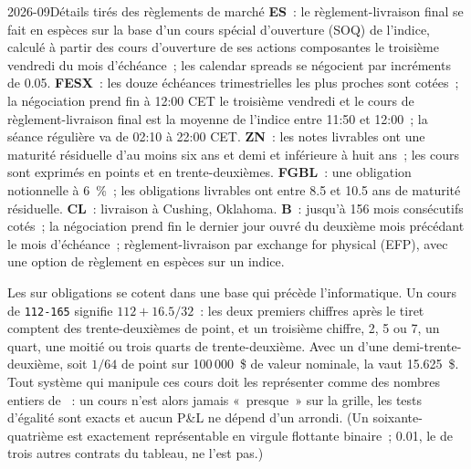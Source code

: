 \begin{dated}{2026-09}{Détails tirés des règlements de marché}\label{dat:m1:futures-contracts-and-exchanges:specs}
\textbf{ES}~: le règlement-livraison final se fait en espèces sur la base d'un cours spécial d'ouverture (SOQ)
de l'indice, calculé à partir des cours d'ouverture de ses actions composantes le
troisième vendredi du mois d'échéance~; les calendar spreads se négocient par incréments
de 0.05. \textbf{FESX}~: les douze échéances trimestrielles les plus proches sont cotées~;
la négociation prend fin à 12:00 CET le troisième vendredi et le cours de règlement-livraison final
est la moyenne de l'indice entre 11:50 et 12:00~; la séance régulière va de
02:10 à 22:00 CET. \textbf{ZN}~: les notes livrables ont une maturité résiduelle
d'au moins six ans et demi et inférieure à huit ans~; les cours sont exprimés
en points et en trente-deuxièmes. \textbf{FGBL}~: une obligation notionnelle à 6~\%~;
les obligations livrables ont entre 8.5 et 10.5 ans de maturité résiduelle. \textbf{CL}~: livraison à
Cushing, Oklahoma. \textbf{B}~: jusqu'à 156 mois consécutifs cotés~; la négociation
prend fin le dernier jour ouvré du deuxième mois précédant le mois d'échéance~;
règlement-livraison par exchange for physical (EFP), avec une option de règlement en espèces sur
un indice.
\end{dated}

Les  sur obligations se cotent dans une base qui précède l'informatique. Un cours de
\texttt{112-165} signifie $112 + 16.5/32$~: les deux premiers chiffres après le tiret
comptent des trente-deuxièmes de point, et un troisième chiffre, 2, 5 ou 7, un quart, une
moitié ou trois quarts de trente-deuxième. Avec un  d'une
demi-trente-deuxième, soit $1/64$ de point sur 100\,000~\$ de valeur nominale, la 
vaut 15.625~\$. Tout système qui manipule ces cours doit les représenter comme
des nombres entiers de ~: un cours n'est alors jamais «~presque~» sur la grille, les tests d'égalité
sont exacts et aucun P\&L ne dépend d'un arrondi. (Un soixante-quatrième
est exactement représentable en virgule flottante binaire~; 0.01, le  de trois autres contrats
du tableau, ne l'est pas.)

